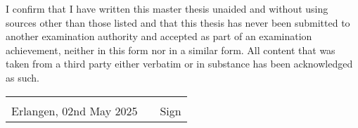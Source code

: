 I confirm that I have written this master thesis unaided and without using sources other than those listed and that this thesis has never been submitted to another examination authority and accepted as part of an examination achievement, neither in this form nor in a similar form. All content that was taken from a third party either verbatim or in substance has been acknowledged as such.
\vskip 2cm

\begin{table}[!htb]
\centering
\begin{tabularx}{\textwidth}{lXl}

       \hspace{6cm} &  & \hspace{6cm} \\
       \cline{3-3}
       Erlangen, 02nd May 2025  &  & Sign
\end{tabularx}
\end{table}